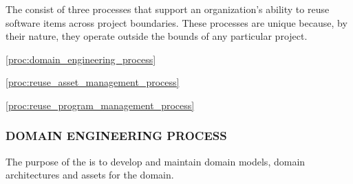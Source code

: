 		\begin{adjustwidth}{1em}{0pt}

			The  consist of three processes that support an organization's ability to reuse software items across project boundaries. These processes are unique because, by their nature, they operate outside the bounds of any particular project.

			\begin{compactitem}
				\item \ref{proc:domain_engineering_process} 
				\item \ref{proc:reuse_asset_management_process} 
				\item \ref{proc:reuse_program_management_process} 
			\end{compactitem}

		\end{adjustwidth}

		\newpage
		\subsubsection{DOMAIN ENGINEERING PROCESS\label{proc:domain_engineering_process}}

			\begin{adjustwidth}{2em}{0pt} 

				The purpose of the  is to develop and maintain domain models, domain architectures and assets for the domain.

			\end{adjustwidth}

